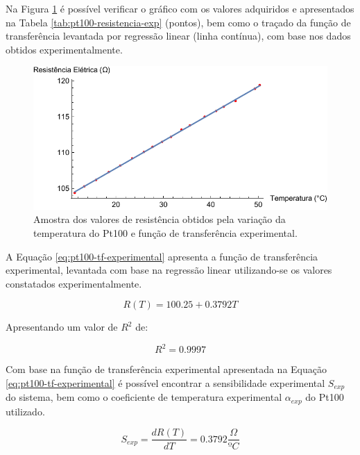 \documentclass[a4paper]{instrumentacao}
\begin{document}
Na Figura \ref{fig:pt100-tf-experimental} é possível verificar o gráfico com os valores adquiridos e apresentados na Tabela \ref{tab:pt100-resistencia-exp} (pontos), bem como o traçado da função de transferência levantada por regressão linear (linha contínua), com base nos dados obtidos experimentalmente.

\begin{figure}[H]
	\centering \includegraphics[width=\textwidth]{Temperatura/ResistenceTransferFunction.pdf}
	\caption{Amostra dos valores de resistência obtidos pela variação da temperatura do Pt100 e função de transferência experimental.}
	\label{fig:pt100-tf-experimental}
\end{figure}

A Equação \ref{eq:pt100-tf-experimental} apresenta a função de transferência experimental, levantada com base na regressão linear utilizando-se os valores constatados experimentalmente.

\begin{equation}
	R(T)=100.25+0.3792T
	\label{eq:pt100-tf-experimental}
\end{equation}

Apresentando um valor de $R^2$ de:

\begin{equation}
	R^2=0.9997
	\label{eq:pt100-r2-tf-experimental}
\end{equation}

Com base na função de transferência experimental apresentada na Equação \ref{eq:pt100-tf-experimental} é possível encontrar a sensibilidade experimental $S_{exp}$ do sistema, bem como o coeficiente de temperatura experimental $\alpha_{exp}$ do Pt100 utilizado.

\begin{equation}
	S_{exp}=\frac{dR(T)}{dT}=0.3792\frac{\Omega}{ºC}
	\label{eq:pt100-sensibilidade-experimental}
\end{equation}
\end{document}
